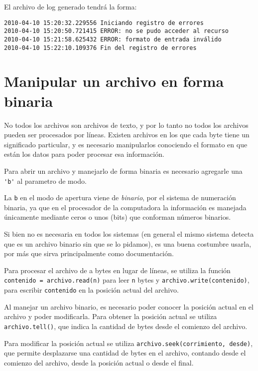 El archivo de log generado tendrá la forma:

\begin{verbatim}
2010-04-10 15:20:32.229556 Iniciando registro de errores
2010-04-10 15:20:50.721415 ERROR: no se pudo acceder al recurso
2010-04-10 15:21:58.625432 ERROR: formato de entrada inválido
2010-04-10 15:22:10.109376 Fin del registro de errores
\end{verbatim}

\section{Manipular un archivo en forma binaria}

No todos los archivos son archivos de texto, y por lo tanto no todos los
archivos pueden ser procesados por líneas. Existen archivos en los que cada
byte tiene un significado particular, y es necesario manipularlos conociendo
el formato en que están los datos para poder procesar esa información.

Para abrir un archivo y manejarlo de forma binaria es necesario agregarle
una \verb!'b'! al parametro de modo.

\begin{sabias_que}
La \texttt{b} en el modo de apertura viene de \textit{binario}, por el
sistema de numeración binaria, ya que en el procesador de la computadora la
información es manejada únicamente mediante ceros o unos (bits) que
conforman números binarios.

Si bien no es necesaria en todos los sistemas (en general el mismo sistema
detecta que es un archivo binario sin que se lo pidamos), es una buena
costumbre usarla, por más que sirva principalmente como documentación.
\end{sabias_que}

Para procesar el archivo de a bytes en lugar de líneas, se utiliza la
función \lstinline!contenido = archivo.read(n)! para leer \lstinline!n!
bytes y \lstinline!archivo.write(contenido)!, para
escribir \lstinline!contenido! en la posición actual del archivo.

Al manejar un archivo binario, es necesario poder conocer la
posición actual en el archivo y poder modificarla. Para obtener la
posición actual se utiliza \lstinline!archivo.tell()!, que 
indica la cantidad de bytes desde el comienzo del archivo.

Para modificar la posición actual se utiliza 
\lstinline!archivo.seek(corrimiento, desde)!, que permite desplazarse una
cantidad de bytes en el archivo, contando desde el comienzo del archivo,
desde la posición actual o desde el final.

